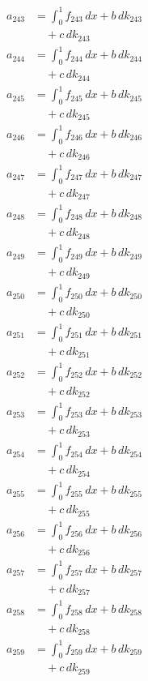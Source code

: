 \documentclass{article}
\begin{document}
\begin{align}
a_{243} &= \int_0^1 f_{243}\,dx + b\,dk_{243} \\
&\quad + c\,dk_{243} \\
a_{244} &= \int_0^1 f_{244}\,dx + b\,dk_{244} \\
&\quad + c\,dk_{244} \\
a_{245} &= \int_0^1 f_{245}\,dx + b\,dk_{245} \\
&\quad + c\,dk_{245} \\
a_{246} &= \int_0^1 f_{246}\,dx + b\,dk_{246} \\
&\quad + c\,dk_{246} \\
a_{247} &= \int_0^1 f_{247}\,dx + b\,dk_{247} \\
&\quad + c\,dk_{247} \\
a_{248} &= \int_0^1 f_{248}\,dx + b\,dk_{248} \\
&\quad + c\,dk_{248} \\
a_{249} &= \int_0^1 f_{249}\,dx + b\,dk_{249} \\
&\quad + c\,dk_{249} \\
a_{250} &= \int_0^1 f_{250}\,dx + b\,dk_{250} \\
&\quad + c\,dk_{250} \\
a_{251} &= \int_0^1 f_{251}\,dx + b\,dk_{251} \\
&\quad + c\,dk_{251} \\
a_{252} &= \int_0^1 f_{252}\,dx + b\,dk_{252} \\
&\quad + c\,dk_{252} \\
a_{253} &= \int_0^1 f_{253}\,dx + b\,dk_{253} \\
&\quad + c\,dk_{253} \\
a_{254} &= \int_0^1 f_{254}\,dx + b\,dk_{254} \\
&\quad + c\,dk_{254} \\
a_{255} &= \int_0^1 f_{255}\,dx + b\,dk_{255} \\
&\quad + c\,dk_{255} \\
a_{256} &= \int_0^1 f_{256}\,dx + b\,dk_{256} \\
&\quad + c\,dk_{256} \\
a_{257} &= \int_0^1 f_{257}\,dx + b\,dk_{257} \\
&\quad + c\,dk_{257} \\
a_{258} &= \int_0^1 f_{258}\,dx + b\,dk_{258} \\
&\quad + c\,dk_{258} \\
a_{259} &= \int_0^1 f_{259}\,dx + b\,dk_{259} \\
&\quad + c\,dk_{259} \\

\end{align}
\end{document}
